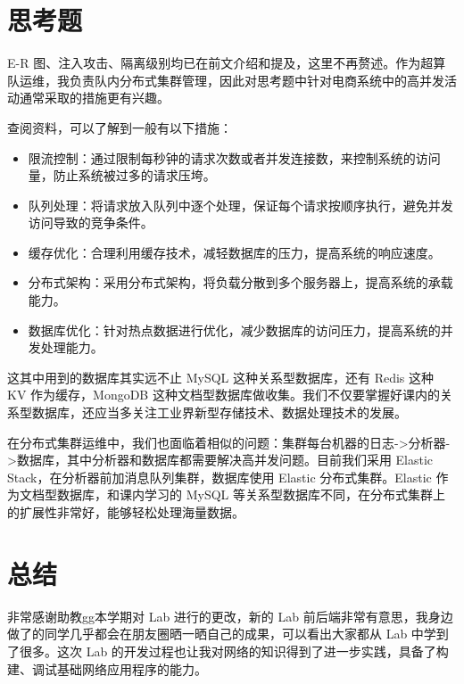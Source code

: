 \documentclass[a4paper,oneside]{ctexbook}
\begin{document}
\chapter{思考题}

E-R 图、注入攻击、隔离级别均已在前文介绍和提及，这里不再赘述。作为超算队运维，我负责队内分布式集群管理，因此对思考题中针对电商系统中的高并发活动通常采取的措施更有兴趣。

查阅资料，可以了解到一般有以下措施：

\begin{itemize}
    \item 限流控制：通过限制每秒钟的请求次数或者并发连接数，来控制系统的访问量，防止系统被过多的请求压垮。
    \item 队列处理：将请求放入队列中逐个处理，保证每个请求按顺序执行，避免并发访问导致的竞争条件。
    \item 缓存优化：合理利用缓存技术，减轻数据库的压力，提高系统的响应速度。
    \item 分布式架构：采用分布式架构，将负载分散到多个服务器上，提高系统的承载能力。
    \item 数据库优化：针对热点数据进行优化，减少数据库的访问压力，提高系统的并发处理能力。
\end{itemize}

这其中用到的数据库其实远不止 MySQL 这种关系型数据库，还有 Redis 这种 KV 作为缓存，MongoDB 这种文档型数据库做收集。我们不仅要掌握好课内的关系型数据库，还应当多关注工业界新型存储技术、数据处理技术的发展。

在分布式集群运维中，我们也面临着相似的问题：集群每台机器的日志->分析器->数据库，其中分析器和数据库都需要解决高并发问题。目前我们采用 Elastic Stack，在分析器前加消息队列集群，数据库使用 Elastic 分布式集群。Elastic 作为文档型数据库，和课内学习的 MySQL 等关系型数据库不同，在分布式集群上的扩展性非常好，能够轻松处理海量数据。

\chapter{总结}

非常感谢助教gg本学期对 Lab 进行的更改，新的 Lab 前后端非常有意思，我身边做了的同学几乎都会在朋友圈晒一晒自己的成果，可以看出大家都从 Lab 中学到了很多。这次 Lab 的开发过程也让我对网络的知识得到了进一步实践，具备了构建、调试基础网络应用程序的能力。


\end{document}
